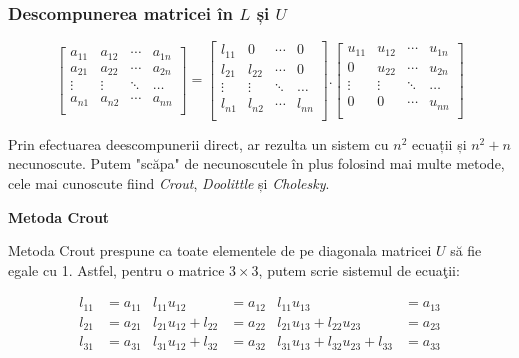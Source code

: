 \documentclass{exam}
\begin{document}
\subsubsection{Descompunerea matricei în $L$ și $U$}

\begin{equation*}
	\begin{bmatrix}
		a_{11} & a_{12} & \cdots & a_{1n} \\
		a_{21} & a_{22} & \cdots & a_{2n} \\
		\vdots & \vdots & \ddots & \dots  \\
		a_{n1} & a_{n2} & \cdots & a_{nn} \\
	\end{bmatrix} =
	\begin{bmatrix}
		l_{11} & 0      & \cdots & 0      \\
		l_{21} & l_{22} & \cdots & 0      \\
		\vdots & \vdots & \ddots & \dots  \\
		l_{n1} & l_{n2} & \cdots & l_{nn} \\
	\end{bmatrix} .
	\begin{bmatrix}
		u_{11} & u_{12} & \cdots & u_{1n} \\
		0      & u_{22} & \cdots & u_{2n} \\
		\vdots & \vdots & \ddots & \dots  \\
		0      & 0      & \cdots & u_{nn} \\
	\end{bmatrix}
\end{equation*}

\par Prin efectuarea deescompunerii direct, ar rezulta un sistem cu $n^2$
ecuații și $n^2 + n$ necunoscute. Putem "scăpa" de necunoscutele în plus
folosind mai multe metode, cele mai cunoscute fiind \textit{Crout},
\textit{Doolittle} și \textit{Cholesky}.

\textbf{Metoda Crout}

\par Metoda Crout prespune ca toate elementele de pe diagonala matricei $U$ să
fie egale cu 1. Astfel, pentru o matrice $3 \times 3$, putem scrie sistemul de
ecuaţii:

\begin{align*}
	l_{11} & = a_{11} & l_{11}u_{12}          & = a_{12} & l_{11}u_{13}                         & = a_{13} \\
	l_{21} & = a_{21} & l_{21}u_{12} + l_{22} & = a_{22} & l_{21}u_{13} + l_{22}u_{23}          & = a_{23} \\
	l_{31} & = a_{31} & l_{31}u_{12} + l_{32} & = a_{32} & l_{31}u_{13} + l_{32}u_{23} + l_{33} & = a_{33}
\end{align*}
\end{document}

